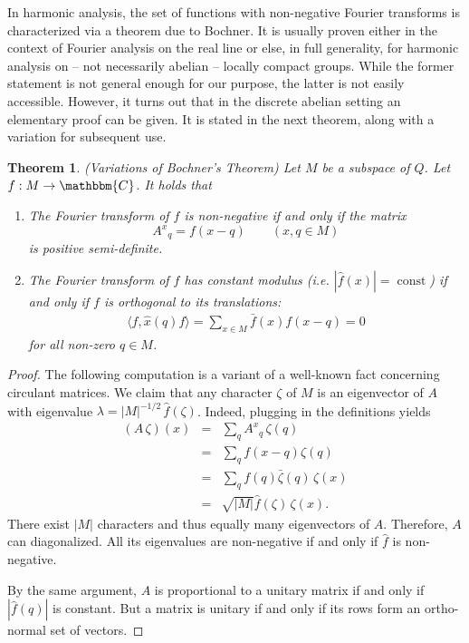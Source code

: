\documentclass[aps,twocolumn,floatfix]{revtex4}
\newtheorem{theorem}{Theorem}
\def\tuple#1.{\langle#1\rangle}
\def\CC{\mathbbm{C}}
\DeclareMathOperator{\const}{const}
\begin{document}
In harmonic analysis, the set of functions with non-negative Fourier
transforms is characterized via a theorem due to Bochner. 
It is usually proven either in the
context of Fourier analysis on the real line or else, in full
generality, for harmonic analysis on -- not necessarily abelian -- locally
compact groups. While the former statement is not general enough for
our purpose, the latter is not easily accessible. However, it turns
out that in the discrete abelian setting an elementary proof can be
given. It is stated in the next theorem, along with a variation
for subsequent use.

\begin{theorem}\label{thBochner}
	\emph{(Variations of Bochner's Theorem)}
	Let $M$ be a subspace of $Q$.  Let $f: M\to \CC$. It holds that
	\begin{enumerate}
		\item\label{bochnerOne} 
		The Fourier transform of $f$ is non-negative if and only if the
		matrix
		\begin{equation*}
			{A^x}_q=f(x-q)\quad\quad (x,q\in M)
		\end{equation*}
		is positive semi-definite.

		\item\label{bochnerTwo}
		The Fourier transform of $f$ has constant modulus (i.e. $|\hat
		f(x)|=\const$) if and only if	$f$ is orthogonal to its
		translations:
		\begin{eqnarray*}
			\tuple f, \hat x(q) f. = \sum_{x\in M} \bar f(x) f(x-q) = 0
		\end{eqnarray*}
		for all non-zero $q\in M$.
	\end{enumerate}
\end{theorem}


\begin{proof}
	The following computation is a variant of a well-known fact
	concerning circulant matrices.  We claim that any character $\zeta$
	of $M$ is an eigenvector of $A$ with eigenvalue
	$\lambda=|M|^{-1/2}\,\hat f(\zeta)$. Indeed, plugging in the
	definitions yields
	\begin{eqnarray*}
		(A\, \zeta)(x)   
		&=& \sum_{q} {A^x}_q\, \zeta(q) \\
		&=& \sum_{q} f(x-q) \zeta(q) \\
		&=& \sum_{q} f(q) \bar\zeta(q)\, \zeta(x) \\
		&=& \sqrt{|M|}\hat f(\zeta)\, \zeta(x). 
	\end{eqnarray*}
	There exist $|M|$ characters and thus equally many eigenvectors of
	$A$. Therefore, $A$ can diagonalized.  All its eigenvalues are
	non-negative if and only if $\hat f$ is non-negative.

	By the same argument, $A$ is proportional to a unitary matrix if and
	only if $|\hat f(q)|$ is constant. But a matrix is unitary if and
	only if its rows form an ortho-normal set of vectors.
\end{proof}
\end{document}
